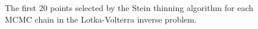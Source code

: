 \documentclass[11pt,a4paper]{report}
\begin{document}
\begin{figure}[h]
\centering
{}
\caption{The first 20 points selected by the Stein thinning algorithm for each MCMC chain in the Lotka-Volterra inverse problem.
\label{fig:lotka-volterra:stein:results}}
\end{figure}
\end{document}
